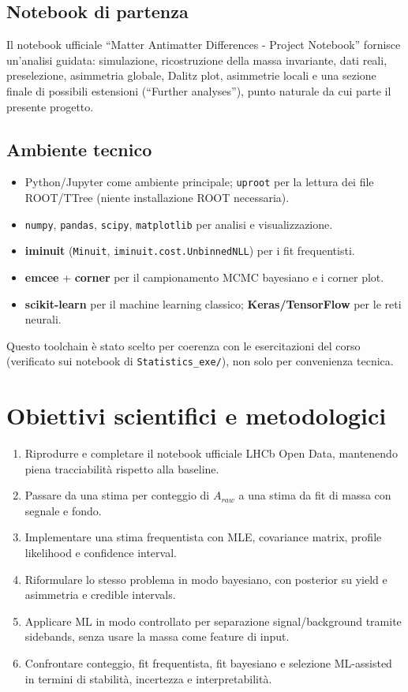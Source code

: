 \documentclass[11pt,a4paper]{article}
\begin{document}
\subsection*{Notebook di partenza}
Il notebook ufficiale ``Matter Antimatter Differences - Project Notebook'' fornisce un'analisi guidata: simulazione, ricostruzione della massa invariante, dati reali, preselezione, asimmetria globale, Dalitz plot, asimmetrie locali e una sezione finale di possibili estensioni (``Further analyses''), punto naturale da cui parte il presente progetto.

\subsection*{Ambiente tecnico}
\begin{itemize}[leftmargin=1.4em]
    \item Python/Jupyter come ambiente principale; \texttt{uproot} per la lettura dei file ROOT/TTree (niente installazione ROOT necessaria).
    \item \texttt{numpy}, \texttt{pandas}, \texttt{scipy}, \texttt{matplotlib} per analisi e visualizzazione.
    \item \textbf{iminuit} (\texttt{Minuit}, \texttt{iminuit.cost.UnbinnedNLL}) per i fit frequentisti.
    \item \textbf{emcee} + \textbf{corner} per il campionamento MCMC bayesiano e i corner plot.
    \item \textbf{scikit-learn} per il machine learning classico; \textbf{Keras/TensorFlow} per le reti neurali.
\end{itemize}
\noindent Questo toolchain è stato scelto per coerenza con le esercitazioni del corso (verificato sui notebook di \texttt{Statistics\_exe/}), non solo per convenienza tecnica.

\section{Obiettivi scientifici e metodologici}
\begin{enumerate}[leftmargin=1.4em]
    \item Riprodurre e completare il notebook ufficiale LHCb Open Data, mantenendo piena tracciabilità rispetto alla baseline.
    \item Passare da una stima per conteggio di $A_{raw}$ a una stima da fit di massa con segnale e fondo.
    \item Implementare una stima frequentista con MLE, covariance matrix, profile likelihood e confidence interval.
    \item Riformulare lo stesso problema in modo bayesiano, con posterior su yield e asimmetria e credible intervals.
    \item Applicare ML in modo controllato per separazione signal/background tramite sidebands, senza usare la massa come feature di input.
    \item Confrontare conteggio, fit frequentista, fit bayesiano e selezione ML-assisted in termini di stabilità, incertezza e interpretabilità.
\end{enumerate}
\end{document}
